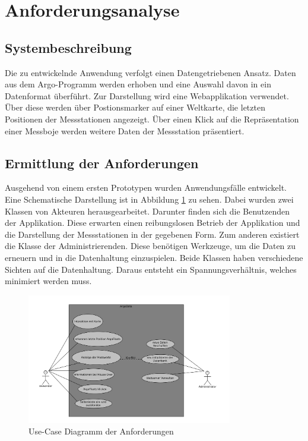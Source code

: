 \section{Anforderungsanalyse}

\subsection{Systembeschreibung}

    Die zu entwickelnde Anwendung verfolgt einen Datengetriebenen Ansatz. Daten aus dem Argo-Programm werden erhoben und eine Auswahl davon in ein Datenformat überführt. Zur Darstellung wird eine Webapplikation verwendet. Über diese werden   über Postionsmarker auf einer Weltkarte, die letzten Positionen der Messstationen angezeigt.  Über einen Klick auf die Repräsentation einer Messboje werden weitere Daten der Messstation präsentiert.



    \subsection{Ermittlung der Anforderungen}

    Ausgehend von einem ersten Prototypen wurden Anwendungsfälle entwickelt. Eine Schematische Darstellung ist in Abbildung  \ref{fig:use_case} zu sehen. Dabei wurden zwei Klassen von Akteuren herausgearbeitet. Darunter finden sich die Benutzenden der Applikation. Diese erwarten einen reibungslosen Betrieb der Applikation und die Darstellung der Messstationen in der gegebenen Form. Zum anderen existiert die Klasse der Administrierenden. Diese benötigen Werkzeuge, um die Daten zu erneuern und in die Datenhaltung einzuspielen. Beide Klassen haben verschiedene Sichten auf die Datenhaltung. Daraus entsteht ein Spannungsverhältnis, welches minimiert werden muss.

    \begin{figure}[h!]
        \centering
        \includegraphics[width=0.8\textwidth]{pix/use-case.png}
        \caption{Use-Case Diagramm der Anforderungen}
        \label{fig:use_case}
    \end{figure}

